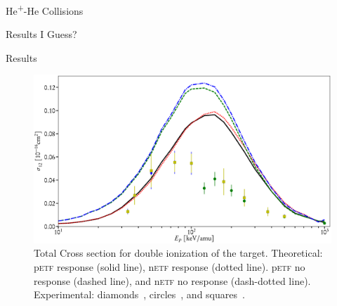 \documentclass[letterpaper, 11 pt]{report}
\begin{document}
\begin{chapter}{\texorpdfstring{He\textsuperscript{+}}{He+}-He Collisions \label{chap:hephe}}
\begin{section}{Results I Guess? \label{sec:hephe-disc}}
\begin{subsection}{Results \label{sec:hephe-res}}
         \begin{figure}[t]
            \centering
            \includegraphics[width = \linewidth]{./images/hephe-cross/HepHe-012.eps}
            \caption[Total Cross section for double ionization of the target in He\textsuperscript{+}-He
                     collisions.]
                    {Total Cross section for double ionization of the target.
                     Theoretical: p\textsc{etf} response (solid line), n\textsc{etf} response
                                  (dotted line).
                                  p\textsc{etf} no response (dashed line), and n\textsc{etf} no response
                                  (dash-dotted line).
                     Experimental: diamonds~\cite{Dub-89}, circles~\cite{FTFHLP-95}, and
                                   squares~\cite{DT-88}. \label{fig:cs012}}
         \end{figure}
 

\end{subsection}
\end{section}
\end{chapter}
\end{document}
